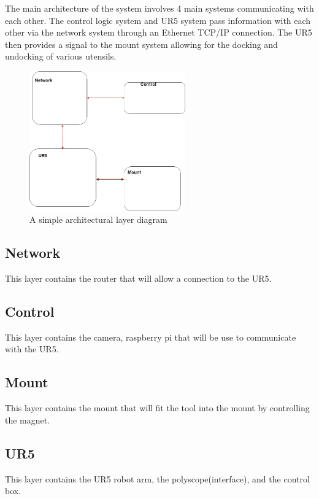 The main architecture of the system involves 4 main systems communicating with each other. The control logic system and UR5 system pass information with each other via the network system through an Ethernet TCP/IP connection.  The UR5 then provides a signal to the mount system allowing for the docking and undocking of various utensils.

\begin{figure}[h!]
	\centering
 	\includegraphics[width=0.60\textwidth]{images/ADS_layers}
 \caption{A simple architectural layer diagram}
\end{figure}

\subsection{Network}
This layer contains the router that will allow a connection to the UR5.

\subsection{Control}
This layer contains the camera, raspberry pi that will be use to communicate with the UR5.

\subsection{Mount}
This layer contains the mount that will fit the tool into the mount by controlling the magnet.

\subsection{UR5}
This layer contains the UR5 robot arm, the polyscope(interface), and the control box.